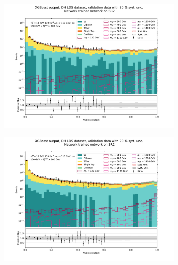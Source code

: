 \documentclass[12pt, a4paper]{book}
\begin{document}
\begin{figure}[!ht]
	\centering
	\begin{subfigure}[b]{0.49\textwidth}
      \centering
      \includegraphics[width=1\textwidth]{XGBoost/Model_independent/100-150/DH_LDS/VAL_ee.pdf}
   \end{subfigure}
   \hfill
   \begin{subfigure}[b]{0.49\textwidth}
      \centering
      \includegraphics[width=1\textwidth]{XGBoost/Model_independent/100-150/DH_LDS/VAL_uu.pdf}
   \end{subfigure}
   \hfill
   \begin{subfigure}[b]{0.49\textwidth}
      \centering

\end{subfigure}
\end{figure}
\end{document}

